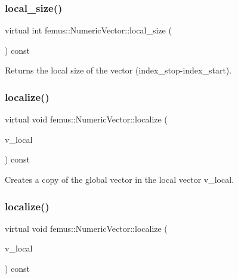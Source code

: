 \subsubsection{\texorpdfstring{local\+\_\+size()}{local\_size()}}
{\footnotesize\ttfamily virtual int femus\+::\+Numeric\+Vector\+::local\+\_\+size (\begin{DoxyParamCaption}{ }\end{DoxyParamCaption}) const\hspace{0.3cm}{\ttfamily [pure virtual]}}

\begin{DoxyReturn}{Returns}
the local size of the vector (index\+\_\+stop-\/index\+\_\+start). 
\end{DoxyReturn}
\mbox{\label{classfemus_1_1_numeric_vector_abd237a8a3e8ec60b2b6953db2c0bb3d7}} 
\subsubsection{\texorpdfstring{localize()}{localize()}\hspace{0.1cm}{\footnotesize\ttfamily [1/4]}}
{\footnotesize\ttfamily virtual void femus\+::\+Numeric\+Vector\+::localize (\begin{DoxyParamCaption}\item[{std\+::vector$<$ double $>$ \&}]{v\+\_\+local }\end{DoxyParamCaption}) const\hspace{0.3cm}{\ttfamily [pure virtual]}}



Creates a copy of the global vector in the local vector {\ttfamily v\+\_\+local}. 

\mbox{\label{classfemus_1_1_numeric_vector_abc5c852cbb755c8e0b3eb6c59d145ae0}} 
\subsubsection{\texorpdfstring{localize()}{localize()}\hspace{0.1cm}{\footnotesize\ttfamily [2/4]}}
{\footnotesize\ttfamily virtual void femus\+::\+Numeric\+Vector\+::localize (\begin{DoxyParamCaption}\item[{\mbox{\hyperlink{classfemus_1_1_numeric_vector}{Numeric\+Vector}} \&}]{v\+\_\+local }\end{DoxyParamCaption}) const\hspace{0.3cm}{\ttfamily [pure virtual]}}



